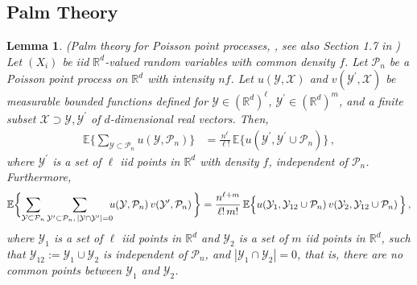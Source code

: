 \documentclass[11pt]{amsart}
\numberwithin{equation}{section}
\theoremstyle{plain}
\newtheorem{lemma}[theorem]{Lemma}
\theoremstyle{definition}
\begin{document}
\subsection{Palm Theory}

\begin{lemma} (Palm theory for Poisson point processes, \cite{arratia:goldstein:gordon:1989}, see also Section 1.7 in \cite{penrose:2003})  \label{l:palm}
Let $(X_i)$ be iid ${{\mathbb R}}^d$-valued random variables with common density $f$. Let ${\mathcal P_n}$ be a Poisson point process on ${{\mathbb R}}^d$ with intensity $nf$. Let $u({{\mathcal{Y}}}, \mathcal X)$ and $v({{\mathcal{Y}^{\prime}}}, {{\mathcal{X}}})$ be measurable bounded functions defined for ${{\mathcal{Y}}} \in ({{\mathbb R}}^d)^\ell$, ${{\mathcal{Y}^{\prime}}} \in ({{\mathbb R}}^d)^m$, and a finite subset ${{\mathcal{X}}}  \supset {{\mathcal{Y}}}, {{\mathcal{Y}^{\prime}}}$ of $d$-dimensional real vectors. Then,
\begin{align*}
{\mathbb{E}} \biggl\{ \sum_{{{\mathcal{Y}}} \subset {\mathcal P_n}}  u({{\mathcal{Y}}}, {\mathcal P_n}) \biggr\} &= \frac{n^\ell}{\ell !}\, {\mathbb{E}} \bigl\{ u({{\mathcal{Y}^{\prime}}}, {{\mathcal{Y}^{\prime}}} \cup {\mathcal P_n}) \bigr\}\,,
\end{align*}
where ${{\mathcal{Y}^{\prime}}}$ is a set of $\ell$ iid points in ${{\mathbb R}}^d$ with density $f$, independent of ${\mathcal P_n}$.
Furthermore,
\begin{align*}
{\mathbb{E}} \biggl\{ \sum_{{{\mathcal{Y}}} \subset {\mathcal P_n}} \sum_{{{\mathcal{Y}^{\prime}}} \subset {\mathcal P_n}, \, |{{\mathcal{Y}}} \cap {{\mathcal{Y}^{\prime}}}| = 0} \hspace{-5pt} u({{\mathcal{Y}}}, {\mathcal P_n})\, v({{\mathcal{Y}^{\prime}}}, {\mathcal P_n})\, \biggr\}
= \frac{n^{\ell + m}}{\ell ! \, m !}\, {\mathbb{E}} \Bigl\{u({{\mathcal{Y}}}_1, {{\mathcal{Y}}}_{12} \cup {\mathcal P_n})\, v({{\mathcal{Y}}}_2, {{\mathcal{Y}}}_{12} \cup {\mathcal P_n})\, \Bigr\}\,,
\end{align*}
where ${{\mathcal{Y}}}_1$ is a set of $\ell$ iid points in ${{\mathbb R}}^d$ and ${{\mathcal{Y}}}_2$ is a set of $m$ iid points in ${{\mathbb R}}^d$, such that ${{\mathcal{Y}}}_{12} := {{\mathcal{Y}}}_1 \cup {{\mathcal{Y}}}_2$ is independent of ${\mathcal P_n}$, and $|{{\mathcal{Y}}}_1 \cap {{\mathcal{Y}}}_2| = 0$, that is, there are no common points between ${{\mathcal{Y}}}_1$ and ${{\mathcal{Y}}}_2$.
\vspace{5pt}


\end{lemma}
\end{document}
